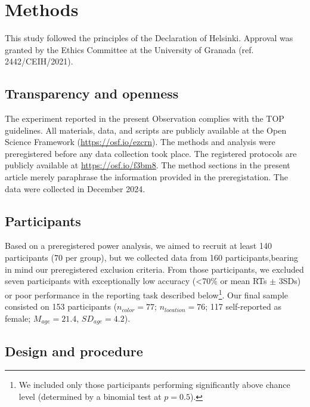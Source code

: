 \documentclass[
  jou,
  floatsintext,
  longtable,
  nolmodern,
  notxfonts,
  notimes,
  colorlinks=true,linkcolor=blue,citecolor=blue,urlcolor=blue]{apa7}
\begin{document}
\section{Methods}\label{methods}

This study followed the principles of the Declaration of Helsinki.
Approval was granted by the Ethics Committee at the University of
Granada (ref. 2442/CEIH/2021).

\subsection{Transparency and openness}\label{transparency-and-openness}

The experiment reported in the present Observation complies with the TOP
guidelines. All materials, data, and scripts are publicly available at
the Open Science Framework (\url{https://osf.io/ezcrn}). The methods and
analysis were preregistered before any data collection took place. The
registered protocols are publicly available at
\url{https://osf.io/f3bm8}. The method sections in the present article
merely paraphrase the information provided in the preregistation. The
data were collected in December 2024.

\subsection{Participants}\label{participants}

Based on a preregistered power analysis, we aimed to recruit at least
140 participants (70 per group), but we collected data from 160
participants,bearing in mind our preregistered exclusion criteria. From
those participants, we excluded seven participants with exceptionally
low accuracy (\textless70\% or mean RTs \(\pm\) 3SDs) or poor
performance in the reporting task described below\footnote{We included
  only those participants performing significantly above chance level
  (determined by a binomial test at \(p = 0.5\)).}. Our final sample
consisted on 153 participants (\(n_{color} = 77\);
\(n_{location} = 76\); 117 self-reported as female; \(M_{age} = 21.4\),
\(SD_{age} = 4.2\)).

\subsection{Design and procedure}\label{design-and-procedure}
\end{document}
